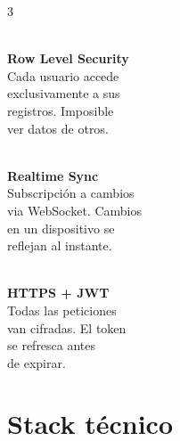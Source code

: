\documentclass[a4paper,11pt]{article}
\begin{document}
\begin{multicols}{3}
\begin{tcolorbox}[greencard,halign=center]
  {\color{ngreen}\Large\faShieldAlt}\\[4pt]
  {\color{ngreen}\bfseries\small Row Level Security}\\[3pt]
  {\color{tm}\scriptsize Cada usuario accede\\exclusivamente a sus\\registros. Imposible\\ver datos de otros.}
\end{tcolorbox}

\columnbreak

\begin{tcolorbox}[cyancard,halign=center]
  {\color{ncyan}\Large\faSync}\\[4pt]
  {\color{ncyan}\bfseries\small Realtime Sync}\\[3pt]
  {\color{tm}\scriptsize Subscripción a cambios\\via WebSocket. Cambios\\en un dispositivo se\\reflejan al instante.}
\end{tcolorbox}

\columnbreak

\begin{tcolorbox}[purplecard,halign=center]
  {\color{npurple}\Large\faLock}\\[4pt]
  {\color{npurple}\bfseries\small HTTPS + JWT}\\[3pt]
  {\color{tm}\scriptsize Todas las peticiones\\van cifradas. El token\\se refresca antes\\de expirar.}
\end{tcolorbox}
\end{multicols}

\newpage

\thispagestyle{empty}

\section{Stack técnico}
\end{document}
